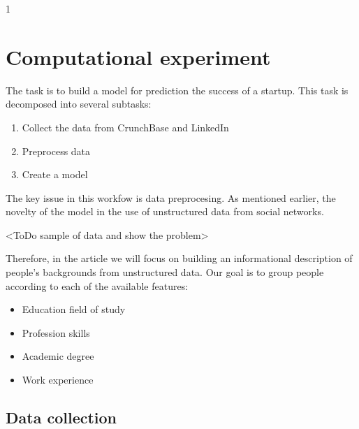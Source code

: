 \documentclass[12pt]{article}
\theoremstyle{plain}
\theoremstyle{definition}
\begin{document}



1

\section{Computational experiment}

The task is to build a model for prediction the success of a startup. This task is decomposed into several subtasks:

\begin{enumerate}
    \item Collect the data from CrunchBase and LinkedIn
    \item Preprocess data
    \item Create a model
\end{enumerate}

The key issue in this workfow is data preprocesing. As mentioned earlier, the novelty of the model in the use of unstructured data from social networks. 

<ToDo sample of data and show the problem>

Therefore, in the article we will focus on building an informational description of people's backgrounds from unstructured data. Our goal is to group people according to each of the available features:

\begin{itemize}
    \item Education field of study
    \item Profession skills
    \item Academic degree
    \item Work experience
\end{itemize}

\subsection{Data collection}
\end{document}
